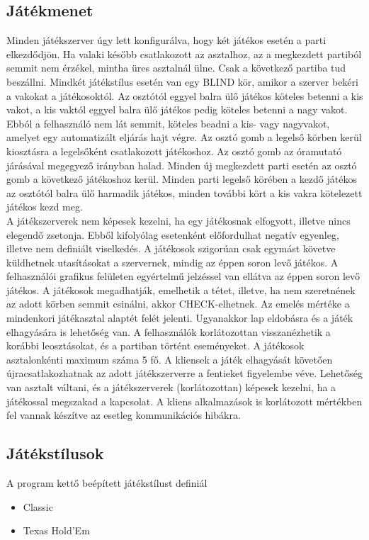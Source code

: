 \subsection{Játékmenet}
Minden játékszerver úgy lett konfigurálva, hogy két játékos esetén a parti elkezdődjön. Ha valaki később csatlakozott az asztalhoz, az a megkezdett partiból semmit nem érzékel, mintha üres asztalnál ülne. Csak a következő partiba tud beszállni. Mindkét játékstílus esetén van egy BLIND kör, amikor a szerver bekéri a vakokat a játékosoktól. Az osztótól eggyel balra ülő játékos köteles betenni a kis vakot, a kis vaktól eggyel balra ülő játékos pedig köteles betenni a nagy vakot. Ebból a felhasználó nem lát semmit, köteles beadni a kis- vagy nagyvakot, amelyet egy automatizált eljárás hajt végre. Az osztó gomb  a legelső körben kerül kiosztásra a legelsőként csatlakozott játékoshoz. Az osztó gomb az óramutató járásával megegyező irányban halad. Minden új megkezdett parti esetén az osztó gomb a következő játékoshoz kerül. Minden parti legelső körében a kezdő játékos az osztótól balra ülő harmadik játékos, minden további kört a kis vakra kötelezett játékos kezd meg.  \\
A játékszerverek nem képesek kezelni, ha egy játékosnak elfogyott, illetve nincs elegendő zsetonja. Ebből kifolyólag esetenként előfordulhat negatív egyenleg, illetve nem definiált viselkedés. A játékosok szigorúan csak egymást követve küldhetnek utasításokat a szervernek, mindig az éppen soron levő játékos. A felhasználói grafikus felületen egyértelmű jelzéssel van ellátva az éppen soron levő játékos. A játékosok megadhatják, emelhetik a tétet, illetve, ha nem szeretnének az adott körben semmit csinálni, akkor CHECK-elhetnek. Az emelés mértéke a mindenkori játékasztal alaptét felét jelenti. Ugyanakkor lap eldobásra és a játék elhagyására is lehetőség van. A felhasználók korlátozottan visszanézhetik a korábbi leosztásokat, és a partiban történt eseményeket. A játékosok asztalonkénti maximum száma 5 fő. A kliensek a játék elhagyását követően újracsatlakozhatnak az adott játékszerverre a fentieket figyelembe véve. Lehetőség van asztalt váltani, és a játékszerverek (korlátozottan) képesek kezelni, ha a játékossal megszakad a kapcsolat. A kliens alkalmazások is korlátozott mértékben fel vannak készítve az esetleg kommunikációs hibákra.

\subsection{Játékstílusok} \label{subsubsec:game_styles}
A program kettő beépített játékstílust definiál
\begin{itemize}[leftmargin=2cm]
\item Classic \cite{five_card_draw}
\item Texas Hold'Em \cite{texas_holdem}
\end{itemize}


